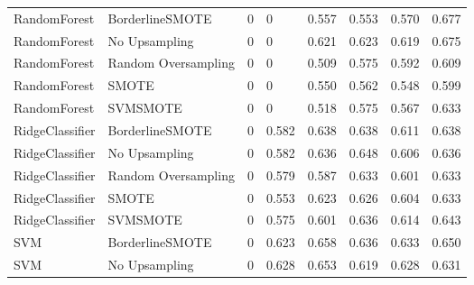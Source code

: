 \begin{tabular}{llllllll}
                RandomForest &     BorderlineSMOTE &     0 &                         0 &                 0.557 &                  0.553 &                                   0.570 &    0.677 \\
                RandomForest &       No Upsampling &     0 &                         0 &                 0.621 &                  0.623 &                                   0.619 &    0.675 \\
                RandomForest & Random Oversampling &     0 &                         0 &                 0.509 &                  0.575 &                                   0.592 &    0.609 \\
                RandomForest &               SMOTE &     0 &                         0 &                 0.550 &                  0.562 &                                   0.548 &    0.599 \\
                RandomForest &            SVMSMOTE &     0 &                         0 &                 0.518 &                  0.575 &                                   0.567 &    0.633 \\
             RidgeClassifier &     BorderlineSMOTE &     0 &                     0.582 &                 0.638 &                  0.638 &                                   0.611 &    0.638 \\
             RidgeClassifier &       No Upsampling &     0 &                     0.582 &                 0.636 &                  0.648 &                                   0.606 &    0.636 \\
             RidgeClassifier & Random Oversampling &     0 &                     0.579 &                 0.587 &                  0.633 &                                   0.601 &    0.633 \\
             RidgeClassifier &               SMOTE &     0 &                     0.553 &                 0.623 &                  0.626 &                                   0.604 &    0.633 \\
             RidgeClassifier &            SVMSMOTE &     0 &                     0.575 &                 0.601 &                  0.636 &                                   0.614 &    0.643 \\
                         SVM &     BorderlineSMOTE &     0 &                     0.623 &                 0.658 &                  0.636 &                                   0.633 &    0.650 \\
                         SVM &       No Upsampling &     0 &                     0.628 &                 0.653 &                  0.619 &                                   0.628 &    0.631 \\

\end{tabular}
